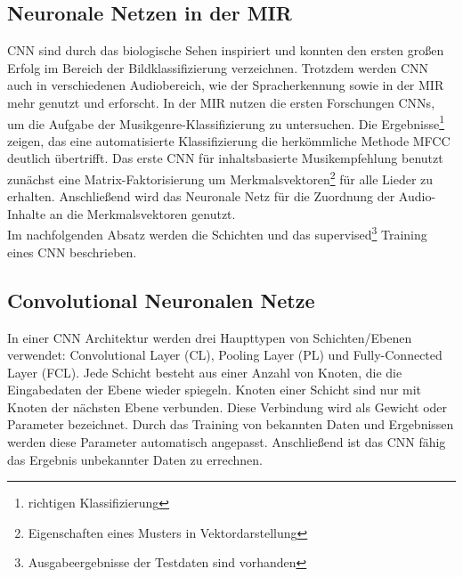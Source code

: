 \documentclass[twosided,a4,10pt]{article}
\begin{document}
\begin{multicols}{2}
		\section{Neuronale Netzen in der MIR}
		CNN sind durch das biologische Sehen inspiriert und konnten den ersten großen Erfolg im Bereich der Bildklassifizierung \cite{alex} verzeichnen. Trotzdem werden CNN auch in verschiedenen Audiobereich, wie der Spracherkennung \cite{graves} sowie in der MIR mehr genutzt und erforscht.\newline
		In der MIR nutzen die ersten Forschungen CNNs, um die Aufgabe der Musikgenre-Klassifizierung \cite{lee} zu untersuchen. Die Ergebnisse\footnote[9]{richtigen Klassifizierung} zeigen, das eine automatisierte Klassifizierung die herkömmliche Methode MFCC deutlich übertrifft. Das erste CNN für inhaltsbasierte Musikempfehlung \cite{oord} benutzt zunächst eine Matrix-Faktorisierung um Merkmalsvektoren\footnote[10]{Eigenschaften eines Musters in Vektordarstellung} für alle Lieder zu erhalten. Anschließend wird das Neuronale Netz für die Zuordnung der Audio-Inhalte an die Merkmalsvektoren genutzt. \cite{wang}\newline\\
		Im nachfolgenden Absatz werden die Schichten und das supervised\footnote[10]{Ausgabeergebnisse der Testdaten sind vorhanden} Training eines CNN beschrieben.
		\subsection{Convolutional Neuronalen Netze}
		In einer CNN Architektur werden drei Haupttypen von Schichten/Ebenen verwendet: Convolutional Layer (CL), Pooling Layer (PL) und Fully-Connected Layer (FCL). Jede Schicht besteht aus einer Anzahl von Knoten, die die Eingabedaten der Ebene wieder spiegeln. Knoten einer Schicht sind nur mit Knoten der nächsten Ebene verbunden. Diese Verbindung wird als Gewicht oder Parameter bezeichnet. Durch das Training von bekannten Daten und Ergebnissen werden diese Parameter automatisch angepasst. Anschließend ist das CNN fähig das Ergebnis unbekannter Daten zu errechnen.

\end{multicols}
\end{document}

